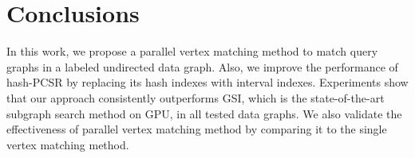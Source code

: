 
\section{Conclusions}
In this work, we propose a parallel vertex matching method to match query graphs in a labeled undirected data graph. Also, we improve the performance of hash-PCSR by replacing its hash indexes with interval indexes. Experiments show that our approach consistently outperforms GSI, which is the state-of-the-art subgraph search method on GPU, in all tested data graphs. We also validate the effectiveness of parallel vertex matching method by comparing it to the single vertex matching method.